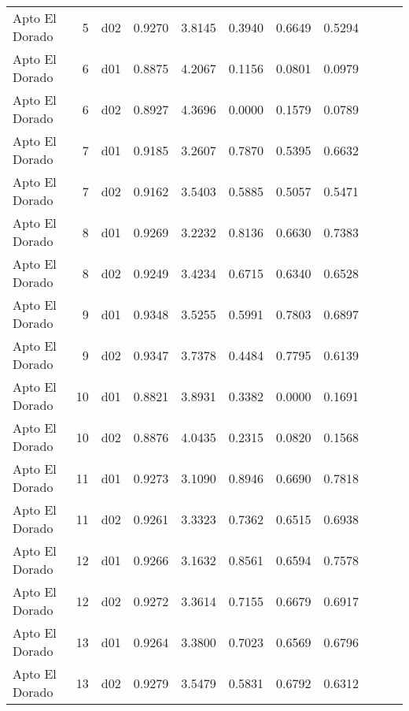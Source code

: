 \begin{landscape}
\begin{longtable}{p{2cm}rrrrrrrrrr}
          Apto El Dorado  &          5 &     d02 &   0.9270 &  3.8145 &        0.3940 &           0.6649 &  0.5294 \\
          Apto El Dorado  &          6 &     d01 &   0.8875 &  4.2067 &        0.1156 &           0.0801 &  0.0979 \\
          Apto El Dorado  &          6 &     d02 &   0.8927 &  4.3696 &        0.0000 &           0.1579 &  0.0789 \\
          Apto El Dorado  &          7 &     d01 &   0.9185 &  3.2607 &        0.7870 &           0.5395 &  0.6632 \\
          Apto El Dorado  &          7 &     d02 &   0.9162 &  3.5403 &        0.5885 &           0.5057 &  0.5471 \\
          Apto El Dorado  &          8 &     d01 &   0.9269 &  3.2232 &        0.8136 &           0.6630 &  0.7383 \\
          Apto El Dorado  &          8 &     d02 &   0.9249 &  3.4234 &        0.6715 &           0.6340 &  0.6528 \\
          Apto El Dorado  &          9 &     d01 &   0.9348 &  3.5255 &        0.5991 &           0.7803 &  0.6897 \\
          Apto El Dorado  &          9 &     d02 &   0.9347 &  3.7378 &        0.4484 &           0.7795 &  0.6139 \\
          Apto El Dorado  &         10 &     d01 &   0.8821 &  3.8931 &        0.3382 &           0.0000 &  0.1691 \\
          Apto El Dorado  &         10 &     d02 &   0.8876 &  4.0435 &        0.2315 &           0.0820 &  0.1568 \\
          Apto El Dorado  &         11 &     d01 &   0.9273 &  3.1090 &        0.8946 &           0.6690 &  0.7818 \\
          Apto El Dorado  &         11 &     d02 &   0.9261 &  3.3323 &        0.7362 &           0.6515 &  0.6938 \\
          Apto El Dorado  &         12 &     d01 &   0.9266 &  3.1632 &        0.8561 &           0.6594 &  0.7578 \\
          Apto El Dorado  &         12 &     d02 &   0.9272 &  3.3614 &        0.7155 &           0.6679 &  0.6917 \\
          Apto El Dorado  &         13 &     d01 &   0.9264 &  3.3800 &        0.7023 &           0.6569 &  0.6796 \\
          Apto El Dorado  &         13 &     d02 &   0.9279 &  3.5479 &        0.5831 &           0.6792 &  0.6312 \\

\end{longtable}
\end{landscape}
